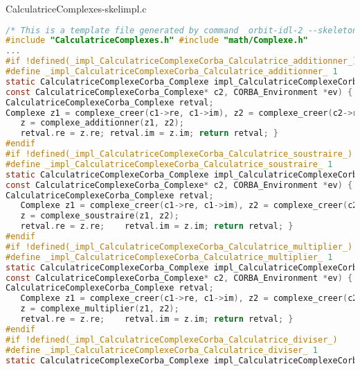 \documentclass{article}
\begin{document}
\vspace{-1ex}
CalculatriceComplexes-skelimpl.c
\vspace{-1.5ex}
\begin{lstlisting}[language=c]
/* This is a template file generated by command  orbit-idl-2 --skeleton-impl CalculatriceComplexes.idl */
#include "CalculatriceComplexes.h" #include "math/Complexe.h"
...
#if !defined(_impl_CalculatriceComplexeCorba_Calculatrice_additionner_)
#define _impl_CalculatriceComplexeCorba_Calculatrice_additionner_ 1
static CalculatriceComplexeCorba_Complexe impl_CalculatriceComplexeCorba_Calculatrice_additionner(impl_POA_CalculatriceComplexeCorba_Calculatrice *servant, const CalculatriceComplexeCorba_Complexe* c1,
const CalculatriceComplexeCorba_Complexe* c2, CORBA_Environment *ev) {
CalculatriceComplexeCorba_Complexe retval;
Complexe z1 = complexe_creer(c1->re, c1->im), z2 = complexe_creer(c2->re, c2->im), z;
   z = complexe_additionner(z1, z2);
   retval.re = z.re; retval.im = z.im; return retval; }
#endif
#if !defined(_impl_CalculatriceComplexeCorba_Calculatrice_soustraire_)
#define _impl_CalculatriceComplexeCorba_Calculatrice_soustraire_ 1
static CalculatriceComplexeCorba_Complexe impl_CalculatriceComplexeCorba_Calculatrice_soustraire(impl_POA_CalculatriceComplexeCorba_Calculatrice *servant, const CalculatriceComplexeCorba_Complexe* c1,
const CalculatriceComplexeCorba_Complexe* c2, CORBA_Environment *ev) {
CalculatriceComplexeCorba_Complexe retval;
   Complexe z1 = complexe_creer(c1->re, c1->im), z2 = complexe_creer(c2->re, c2->im), z;
   z = complexe_soustraire(z1, z2);
   retval.re = z.re;    retval.im = z.im; return retval; }
#endif
#if !defined(_impl_CalculatriceComplexeCorba_Calculatrice_multiplier_)
#define _impl_CalculatriceComplexeCorba_Calculatrice_multiplier_ 1
static CalculatriceComplexeCorba_Complexe impl_CalculatriceComplexeCorba_Calculatrice_multiplier(impl_POA_CalculatriceComplexeCorba_Calculatrice *servant, const CalculatriceComplexeCorba_Complexe* c1,
const CalculatriceComplexeCorba_Complexe* c2, CORBA_Environment *ev) {
CalculatriceComplexeCorba_Complexe retval;
   Complexe z1 = complexe_creer(c1->re, c1->im), z2 = complexe_creer(c2->re, c2->im), z;
   z = complexe_multiplier(z1, z2);
   retval.re = z.re;    retval.im = z.im; return retval; }
#endif
#if !defined(_impl_CalculatriceComplexeCorba_Calculatrice_diviser_)
#define _impl_CalculatriceComplexeCorba_Calculatrice_diviser_ 1
static CalculatriceComplexeCorba_Complexe impl_CalculatriceComplexeCorba_Calculatrice_diviser(impl_POA_CalculatriceComplexeCorba_Calculatrice *servant, const CalculatriceComplexeCorba_Complexe* c1,

\end{lstlisting}
\end{document}
